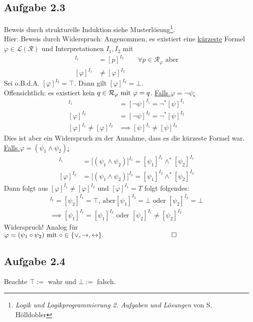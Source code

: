 \subsection{Aufgabe 2.3}
Beweis durch strukturelle Induktion siehe Musterlösung\footnote{\textit{Logik und Logikprogrammierung 2. Aufgaben und Lösungen} von S. Hölldobler}.\\
Hier: Beweis durch Widerspruch: Angenommen, es existiert eine \underline{kürzeste} Formel 
$\varphi\in\mathcal{L}(\mathcal{R})$ und Interpretationen $I_1,I_2$ mit 
\begin{align*}
	[p]^{I_1}&=[p]^{I_2}\qquad\forall p\in\mathcal{R}_\varphi\text{ aber}\\
	[\varphi]^{I_1}&\neq[\varphi]^{I_2}
\end{align*}
Sei o.B.d.A. $[\varphi]^{I_2}=\top$. 
Dann gilt $[\varphi]^{I_2}=\bot$.\\
Offensichtlich: es existiert kein $q\in\mathcal{R}_\varphi\mit\varphi=q$.\nl
\underline{Falls $\varphi=\neg\psi$:}
\begin{align*}
	[\varphi]^{I_1}&=[\neg\psi]^{I_1}=\neg^\ast[\psi]^{I_1}\\
	[\varphi]^{I_2}&=[\neg\psi]^{I_2}=\neg^\ast[\psi]^{I_2}\\
	[\varphi]^{I_1}\neq[\varphi]^{I_2}&\implies[\psi]^{I_1}\neq[\psi]^{I_2}
\end{align*}
Dies ist aber ein Widerspruch zu der Annahme, dass es die kürzeste Formel war.\nl
\underline{Falls $\varphi=(\psi_1\wedge\psi_2)$:}
\begin{align*}
	[\varphi]^{I_1}&=\big[(\psi_1\wedge\psi_2)\big]^{I_1}=[\psi_1]^{I_1}\wedge^\ast[\psi_2]^{I_1}\\
	[\varphi]^{I_2}&=\big[(\psi_1\wedge\psi_2)\big]^{I_2}=[\psi_1]^{I_2}\wedge^\ast[\psi_2]^{I_2}
\end{align*}
Dann folgt aus $[\varphi]^{I_1}\neq[\varphi]^{I_2}$ und $[\varphi]^{I_1}=T$ folgt folgendes:
\begin{align*}
	[\psi_1]^{I_1}=[\psi_2]^{I_1}=\top\text{, aber} [\psi_1]^{I_2}=\bot\text{ oder }[\psi_2]^{I_2}=\bot\\
	\implies
	[\psi_1]^{I_1}=[\psi_1]^{I_2}\text{ oder }[\psi_2]^{I_1}\neq[\psi_2]^{I_2}
\end{align*}
Widerspruch!\nl
Analog für $\varphi=(\psi_1\circ\psi_2)\mit\circ\in\lbrace\vee,\to,\leftrightarrow\rbrace.\qquad\qquad\qquad\qquad\qquad\square$

\subsection{Aufgabe 2.4}
Beachte $\top:=$ wahr und $\bot:=$ falsch.


